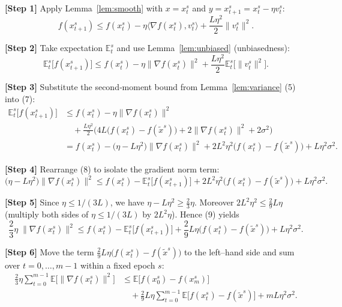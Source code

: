 \documentclass{article}
\begin{document}
\noindent\textbf{[Step 1]} Apply Lemma~\ref{lem:smooth} with $x=x_{t}^{s}$ and $y=x_{t+1}^{s}=x_{t}^{s}-\eta v_{t}^{s}$:
\[
f(x_{t+1}^{s})\le f(x_{t}^{s})-\eta\langle \nabla f(x_{t}^{s}),v_{t}^{s}\rangle+\frac{L\eta^{2}}{2}\|v_{t}^{s}\|^{2}.
\tag{6}
\]

\noindent\textbf{[Step 2]} Take expectation $\mathbb{E}_{t}^{s}$ and use Lemma~\ref{lem:unbiased} (unbiasedness):
\[
\mathbb{E}_{t}^{s}\big[f(x_{t+1}^{s})\big]\le
f(x_{t}^{s})-\eta\|\nabla f(x_{t}^{s})\|^{2}
+\frac{L\eta^{2}}{2}\mathbb{E}_{t}^{s}\!\big[\|v_{t}^{s}\|^{2}\big].
\tag{7}
\]

\noindent\textbf{[Step 3]} Substitute the second‑moment bound from Lemma~\ref{lem:variance} (5) into (7):
\[
\begin{aligned}
\mathbb{E}_{t}^{s}\big[f(x_{t+1}^{s})\big]
&\le f(x_{t}^{s})-\eta\|\nabla f(x_{t}^{s})\|^{2}\\
&\quad+\frac{L\eta^{2}}{2}\Big(4L\big(f(x_{t}^{s})-f(\tilde{x}^{s})\big)+2\|\nabla f(x_{t}^{s})\|^{2}+2\sigma^{2}\Big)\\
&= f(x_{t}^{s})-\Big(\eta-\!L\eta^{2}\Big)\|\nabla f(x_{t}^{s})\|^{2}
   +2L^{2}\eta^{2}\big(f(x_{t}^{s})-f(\tilde{x}^{s})\big)
   +L\eta^{2}\sigma^{2}.
\end{aligned}
\tag{8}
\]

\noindent\textbf{[Step 4]} Rearrange (8) to isolate the gradient norm term:
\[
\Big(\eta-\!L\eta^{2}\Big)\|\nabla f(x_{t}^{s})\|^{2}
\le f(x_{t}^{s})- \mathbb{E}_{t}^{s}\big[f(x_{t+1}^{s})\big]
   +2L^{2}\eta^{2}\big(f(x_{t}^{s})-f(\tilde{x}^{s})\big)
   +L\eta^{2}\sigma^{2}.
\tag{9}
\]

\noindent\textbf{[Step 5]} Since $\eta\le 1/(3L)$, we have $\eta-L\eta^{2}\ge \frac{2}{3}\eta$. Moreover $2L^{2}\eta^{2}\le \frac{2}{9}L\eta$ (multiply both sides of $\eta\le1/(3L)$ by $2L^{2}\eta$). Hence (9) yields
\[
\frac{2}{3}\eta\;\|\nabla f(x_{t}^{s})\|^{2}
\le f(x_{t}^{s})- \mathbb{E}_{t}^{s}\big[f(x_{t+1}^{s})\big]
   +\frac{2}{9}L\eta\big(f(x_{t}^{s})-f(\tilde{x}^{s})\big)
   +L\eta^{2}\sigma^{2}.
\tag{10}
\]

\noindent\textbf{[Step 6]} Move the term $\frac{2}{9}L\eta\big(f(x_{t}^{s})-f(\tilde{x}^{s})\big)$ to the left–hand side and sum over $t=0,\dots,m-1$ within a fixed epoch $s$:
\[
\begin{aligned}
\frac{2}{3}\eta\sum_{t=0}^{m-1}\mathbb{E}\big[\|\nabla f(x_{t}^{s})\|^{2}\big]
&\le \mathbb{E}\big[f(x_{0}^{s})-f(x_{m}^{s})\big]\\
&\quad+\frac{2}{9}L\eta\sum_{t=0}^{m-1}\mathbb{E}\big[f(x_{t}^{s})-f(\tilde{x}^{s})\big]
   +mL\eta^{2}\sigma^{2}.
\end{aligned}
\tag{11}
\]
\end{document}
